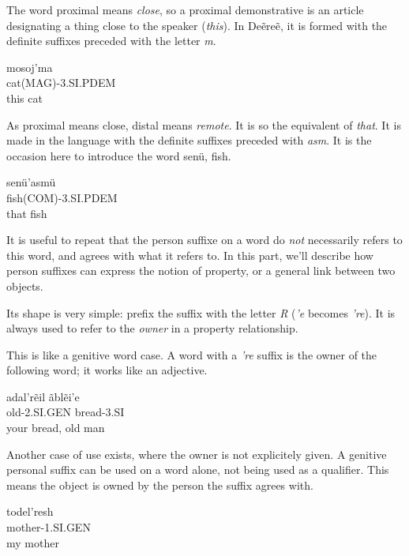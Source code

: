 The word proximal means \emph{close}, so a proximal demonstrative is an article designating a thing
close to the speaker (\emph{this}). In Deẽreẽ, it is formed with the definite suffixes preceded with
the letter \emph{m}.

\begin{exe}
\ex\label{exe:person-prox-dem}
\gll mosoj’ma\\
cat(MAG)-3.SI.PDEM\\
\trans this cat
\end{exe}

As proximal means close, distal means \emph{remote}. It is so the equivalent of \emph{that}. It is
made in the language with the definite suffixes preceded with \emph{asm}. It is the occasion here to
introduce the word \gls{senü}, fish.

\begin{exe}
\ex\label{exe:person-dist-dem}
\gll \gls{senü}’asmü\\
fish(COM)-3.SI.PDEM\\
\trans that fish
\end{exe}

It is useful to repeat that the person suffixe on a word do \emph{not} necessarily refers to this
word, and agrees with what it refers to. In this part, we’ll describe how person suffixes can
express the notion of property, or a general link between two objects.

Its shape is very simple: prefix the suffix with the letter \emph{R} (\emph{’e} becomes \emph{’re}).
It is always used to refer to the \emph{owner} in a property relationship.

This is like a genitive word case. A word with a \emph{’re} suffix is the owner of the following
word; it works like an adjective.

\begin{exe}
\ex\label{exe:person-gen-2obj}
\gll \gls{adal}’rẽil \gls{ãblẽi}’e\\
old-2.SI.GEN bread-3.SI\\
\trans your bread, old man
\end{exe}

Another case of use exists, where the owner is not explicitely given. A genitive personal suffix can
be used on a word alone, not being used as a qualifier. This means the object is owned by the person
the suffix agrees with.

\begin{exe}
\ex\label{exe:person-gen-1obj}
\gll \gls{todel}’resh\\
mother-1.SI.GEN\\
\trans my mother
\end{exe}

